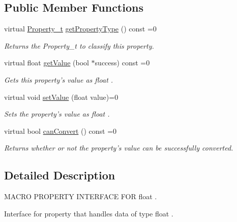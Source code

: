 \subsection*{Public Member Functions}
\begin{DoxyCompactItemize}
\item 
virtual \hyperlink{group___property_classes_ga38f1ccddda12c7cb50b868c9f789ee37}{Property\-\_\-t} \hyperlink{class_i_float_property_a8d82006574891b63c2de22f9b49755a2}{get\-Property\-Type} () const =0
\begin{DoxyCompactList}\small\item\em Returns the Property\-\_\-t to classify this property. \end{DoxyCompactList}\item 
virtual float \hyperlink{class_i_float_property_a5f3b98066c898de66db9141b01253d60}{get\-Value} (bool $\ast$success) const =0
\begin{DoxyCompactList}\small\item\em Gets this property's value as float . \end{DoxyCompactList}\item 
virtual void \hyperlink{class_i_float_property_a358077ee2ced41069d9990d93ce5ddfa}{set\-Value} (float value)=0
\begin{DoxyCompactList}\small\item\em Sets the property's value as float . \end{DoxyCompactList}\item 
virtual bool \hyperlink{class_i_float_property_a1e460fc2f90845794910bc74aabe5236}{can\-Convert} () const =0
\begin{DoxyCompactList}\small\item\em Returns whether or not the property's value can be successfully converted. \end{DoxyCompactList}\end{DoxyCompactItemize}


\subsection{Detailed Description}
M\-A\-C\-R\-O P\-R\-O\-P\-E\-R\-T\-Y I\-N\-T\-E\-R\-F\-A\-C\-E F\-O\-R float . 

Interface for property that handles data of type float . 

